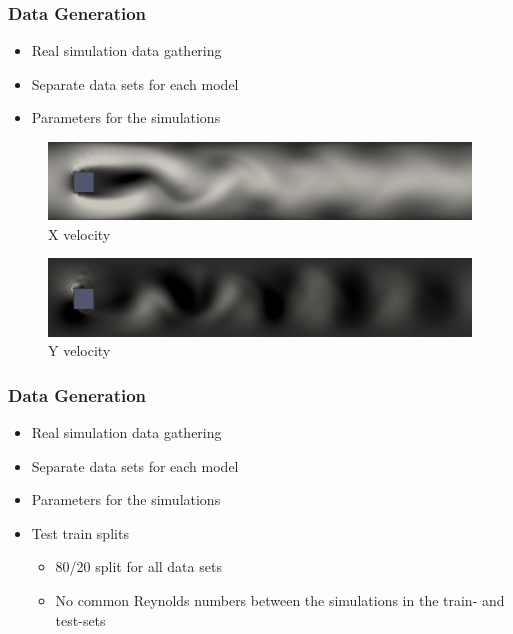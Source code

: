 \documentclass[18pt, xcolor=table]{beamer}
\begin{document}
\begin{frame}[t]
  \frametitle{Data Generation}
  \begin{itemize}
  \item Real simulation data gathering
  \item Separate data sets for each model
  \item Parameters for the simulations
  \end{itemize}
  \begin{center}
    \begin{figure}[htb]
      \includegraphics[scale=0.2]{images/flows/flow_x}
      \caption{X velocity}
      \vspace{-0.2cm}
    \end{figure}

    \begin{figure}[htb]
      \includegraphics[scale=0.2]{images/flows/flow_y}
      \vspace{-0.2cm}
      \caption{Y velocity}
    \end{figure}
  \end{center}
\end{frame}

\begin{frame}[t]
  \frametitle{Data Generation}

  \begin{itemize}
  \item Real simulation data gathering
  \item Separate data sets for each model
  \item Parameters for the simulations
  \item Test train splits
    \begin{itemize}
    \item 80\slash20 split for all data sets
    \item No common Reynolds numbers between the simulations in the train- and test-sets
    \end{itemize}
  \end{itemize}
\end{frame}
\end{document}

